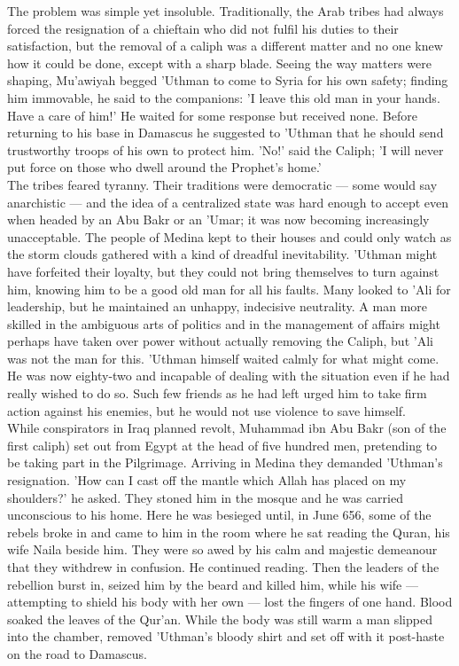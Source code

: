 \documentclass[10pt, twoside,openright]{book}
\begin{document}
The problem was simple yet insoluble. Traditionally, the Arab tribes had always forced the resignation of a chieftain who did not fulfil his duties to their satisfaction, but the removal of a caliph was a different matter and no one knew how it could be done, except with a sharp blade. Seeing the way matters were shaping, Mu'awiyah begged 'Uthman to come to Syria for his own safety; finding him immovable, he said to the companions: 'I leave this old man in your hands. Have a care of him!' He waited for some response but received none. Before returning to his base in Damascus he suggested to 'Uthman that he should send trustworthy troops of his own to protect him. 'No!' said the Caliph; 'I will never put force on those who dwell around the Prophet's home.' \\

The tribes feared tyranny. Their traditions were democratic --- some would say anarchistic --- and the idea of a centralized state was hard enough to accept even when headed by an Abu Bakr or an 'Umar; it was now becoming increasingly unacceptable. The people of Medina kept to their houses and could only watch as the storm clouds gathered with a kind of dreadful inevitability. 'Uthman might have forfeited their loyalty, but they could not bring themselves to turn against him, knowing him to be a good old man for all his faults. Many looked to 'Ali for leadership, but he maintained an unhappy, indecisive neutrality. A man more skilled in the ambiguous arts of politics and in the management of affairs might perhaps have taken over power without actually removing the Caliph, but 'Ali was not the man for this. 'Uthman himself waited calmly for what might come. He was now eighty-two and incapable of dealing with the situation even if he had really wished to do so. Such few friends as he had left urged him to take firm action against his enemies, but he would not use violence to save himself. \\

While conspirators in Iraq planned revolt, Muhammad ibn Abu Bakr (son of the first caliph) set out from Egypt at the head of five hundred men, pretending to be taking part in the Pilgrimage. Arriving in Medina they demanded 'Uthman's resignation. 'How can I cast off the mantle which Allah has placed on my shoulders?' he asked. They stoned him in the mosque and he was carried unconscious to his home. Here he was besieged until, in June 656, some of the rebels broke in and came to him in the room where he sat reading the Quran, his wife Naila beside him. They were so awed by his calm and majestic demeanour that they withdrew in confusion. He continued reading. Then the leaders of the rebellion burst in, seized him by the beard and killed him, while his wife --- attempting to shield his body with her own --- lost the fingers of one hand. Blood soaked the leaves of the Qur'an. While the body was still warm a man slipped into the chamber, removed 'Uthman's bloody shirt and set off with it post\hyp{}haste on the road to Damascus. \\
\end{document}
